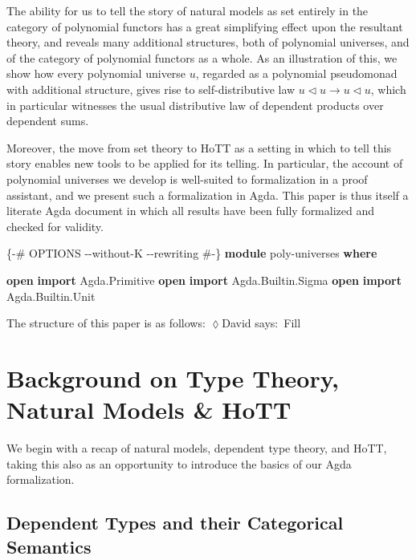\documentclass[
  11pt,
  oneside,
  article]{memoir}
\newenvironment{Shaded}{}{}
\newcommand{\KeywordTok}[1]{\textcolor[rgb]{0.00,0.44,0.13}{\textbf{#1}}}
\newcommand{\NormalTok}[1]{#1}
\newcommand{\OtherTok}[1]{\textcolor[rgb]{0.00,0.44,0.13}{#1}}
\newcommand{\PreprocessorTok}[1]{\textcolor[rgb]{0.74,0.48,0.00}{#1}}
\theoremstyle{definition}
\theoremstyle{plain}
\newcommand{\0}{\textsf{0}}
\newcommand{\1}{\tn{\textsf{1}}}
\newcommand{\tri}{\mathbin{\triangleleft}}
\newcommand{\dnote}[1]{{\quad \color{blue}$\lozenge$\;David says:}~#1\;{\color{blue}$\lozenge$}\quad}
\begin{document}
The ability for us to tell the story of natural models as set entirely 
in the category of polynomial functors has a great simplifying effect
upon the resultant theory, and reveals many additional structures, both
of polynomial universes, and of the category of polynomial functors as a
whole. As an illustration of this, we show how every polynomial universe
\(u\), regarded as a polynomial pseudomonad with additional structure,
gives rise to self-distributive law \(u\tri u\to u\tri u\), which in
particular witnesses the usual distributive law of dependent products
over dependent sums.

Moreover, the move from set theory to HoTT as a setting in which to tell
this story enables new tools to be applied for its telling. In
particular, the account of polynomial universes we develop is
well-suited to formalization in a proof assistant, and we present such a
formalization in Agda. This paper is thus itself a literate Agda
document in which all results have been fully formalized and checked for
validity.

\begin{Shaded}
\begin{Highlighting}[]
\PreprocessorTok{\{{-}\# OPTIONS {-}{-}without{-}K {-}{-}rewriting \#{-}\}}
\KeywordTok{module}\NormalTok{ poly{-}universes }\KeywordTok{where}

\KeywordTok{open} \KeywordTok{import}\NormalTok{ Agda}\OtherTok{.}\NormalTok{Primitive}
\KeywordTok{open} \KeywordTok{import}\NormalTok{ Agda}\OtherTok{.}\NormalTok{Builtin}\OtherTok{.}\NormalTok{Sigma}
\KeywordTok{open} \KeywordTok{import}\NormalTok{ Agda}\OtherTok{.}\NormalTok{Builtin}\OtherTok{.}\NormalTok{Unit}
\end{Highlighting}
\end{Shaded}

The structure of this paper is as follows:
\dnote{Fill}

\chapter{Background on Type Theory, Natural Models \&
HoTT}\label{background-on-type-theory-natural-models-hott}

We begin with a recap of natural models, dependent type theory, and
HoTT, taking this also as an opportunity to introduce the basics of our
Agda formalization.

\section{Dependent Types and their Categorical
Semantics}\label{dependent-types-and-their-categorical-semantics}
\end{document}
